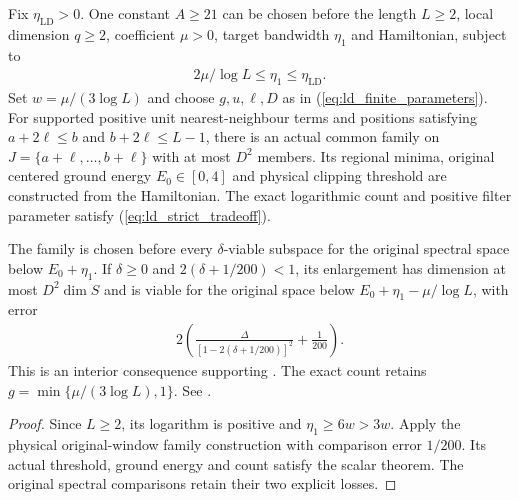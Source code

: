 \begin{lemma}
    \label{thm:interior_low_energy_original_family}
    \leanok
    Fix $\eta_{\mathrm{LD}}>0$. One constant $A\ge21$ can be chosen before
    the length $L\ge2$, local dimension $q\ge2$, coefficient $\mu>0$,
    target bandwidth $\eta_1$ and Hamiltonian, subject to
    \begin{align*}
        2\mu/\log L\le\eta_1\le\eta_{\mathrm{LD}}.
    \end{align*}
    Set $w=\mu/(3\log L)$ and choose $g,u,\ell,D$ as in
    (\ref{eq:ld_finite_parameters}). For supported positive unit
    nearest-neighbour terms and positions satisfying
    $a+2\ell\le b$ and $b+2\ell\le L-1$, there is an actual common
    family on $J=\{a+\ell,\ldots,b+\ell\}$ with at most $D^2$ members.
    Its regional minima, original centered ground energy $E_0\in[0,4]$
    and physical clipping threshold are constructed from the Hamiltonian.
    The exact logarithmic count and positive filter parameter satisfy
    (\ref{eq:ld_strict_tradeoff}).

    The family is chosen before every $\delta$-viable subspace for the
    original spectral space below $E_0+\eta_1$. If $\delta\ge0$ and
    $2(\delta+1/200)<1$, its enlargement has dimension at most
    $D^2\dim S$ and is viable for the original space below
    $E_0+\eta_1-\mu/\log L$, with error
    \begin{align*}
        2\left(\frac{\Delta}{[1-2(\delta+1/200)]^2}+\frac1{200}\right).
    \end{align*}
    This is an interior consequence supporting
    \cite[Theorem~4.8]{Arad2016RigorousRG}. The exact count retains
    $g=\min\{\mu/(3\log L),1\}$. See
    \cite{gap:alvv16_low_energy_family_buffers}.
\end{lemma}
\begin{proof}\leanok
    Since $L\ge2$, its logarithm is positive and
    $\eta_1\ge6w>3w$. Apply the physical original-window family
    construction with comparison error $1/200$. Its actual threshold,
    ground energy and count satisfy the scalar theorem. The original
    spectral comparisons retain their two explicit losses.
\end{proof}
